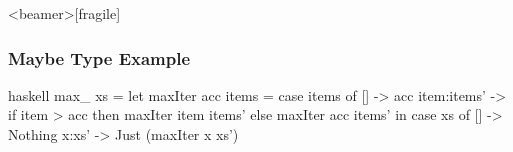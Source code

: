 \documentclass[dvipsnames]{beamer}
\theoremstyle{plain}
\begin{document}
\begin{frame}<beamer>[fragile]
  \frametitle{Maybe Type Example}

  \begin{example}
    \begin{pygments}{haskell}
max_ xs =
    let
       maxIter acc items =
           case items of
             [] -> acc
             item:items' -> if item > acc
                            then maxIter item items'
                            else maxIter acc items'
    in
        case xs of
          [] -> Nothing
          x:xs' -> Just (maxIter x xs')
    \end{pygments}
  \end{example}
\end{frame}

% 
% 
% 
% 
% 
% 
% 
% 
\end{document}
